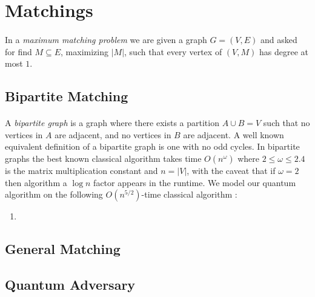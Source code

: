 \section{Matchings}\label{sec:matching}
\paragraph{}
In a {\it maximum matching problem} we are given a graph $G=(V,E)$ and asked for find  $M\subseteq E$, maximizing $|M|$, such that every vertex of $(V,M)$ has degree at most $1$. \subsection{Bipartite Matching}
\paragraph{}
A {\it bipartite graph} is a graph where there exists a partition $A\cup B = V$ such that no vertices in $A$ are adjacent, and no vertices in $B$ are adjacent. A well known equivalent definition of a bipartite graph is one with no odd cycles. In bipartite graphs the best known classical algorithm takes time $O(n^\omega)$ \cite{mucha2004maximum} where $2\leq\omega\leq 2.4$ is the matrix multiplication constant and $n = |V|$, with the caveat that if $\omega = 2$ then algorithm a $\log n$ factor appears in the runtime.  We model our quantum algorithm on the following $O(n^{5/2})$-time classical algorithm \cite{hopkroft1973n5}:
\begin{enumerate}
\item
\end{enumerate}

\subsection{General Matching}

\subsection{Quantum Adversary}                                                                                                                                                                                                                                                                                                                                                                                                                                                                                                                                                                                                                                                                                                                                                                                                                                                                                                                                                                                                                                                                                                                                                                